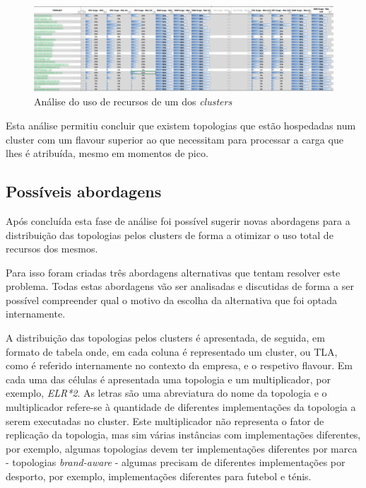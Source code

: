 \begin{figure}[H]
  \centerline{\includegraphics[scale=0.25]{media/content/analise/analise-ofs.png}}
  \caption{Análise do uso de recursos de um dos \textit{clusters}}
  \label{analise-ofs}
\end{figure}

Esta análise permitiu concluir que existem topologias que estão hospedadas num \gls{cluster}
com um \gls{flavour} superior ao que necessitam para processar a carga que lhes é atribuída,
mesmo em momentos de pico. 

\subsection{Possíveis abordagens}

Após concluída esta fase de análise foi possível sugerir novas abordagens para a distribuição
das topologias pelos \glspl{cluster} de forma a otimizar o uso total de recursos dos mesmos.

Para isso foram criadas três abordagens alternativas que tentam resolver este problema. Todas estas
abordagens vão ser analisadas e discutidas de forma a ser possível compreender qual o motivo da
escolha da alternativa que foi optada internamente.

A distribuição das topologias pelos \glspl{cluster} é apresentada, de seguida, em formato de 
tabela onde, em cada coluna é representado um \gls{cluster}, ou \ac{TLA}, como é referido 
internamente no contexto da empresa, e o respetivo \gls{flavour}. Em cada uma das células é
apresentada uma topologia e um multiplicador, por exemplo, \textit{ELR*2}. As letras são uma 
abreviatura do nome da topologia e o multiplicador refere-se à quantidade de diferentes
implementações da topologia a serem executadas no \gls{cluster}. Este multiplicador não representa
o fator de replicação da topologia, mas sim várias instâncias com implementações diferentes, por
exemplo, algumas topologias devem ter implementações diferentes por marca - topologias
\textit{brand-aware} - algumas precisam de diferentes implementações por desporto, por exemplo,
implementações diferentes para futebol e ténis.

